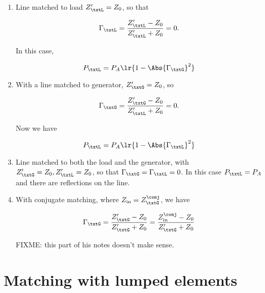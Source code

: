 \begin{enumerate}
\item Line matched to load \( Z_\txtL' = Z_0 \), so that

\begin{dmath}\label{eqn:uwavesDeck6LCmatchingCore:80}
\Gamma_\txtL 
= \frac{Z_\txtL' - Z_0}{Z_\txtL' + Z_0}
= 0.
\end{dmath}

In this case, 

\begin{dmath}\label{eqn:uwavesDeck6LCmatchingCore:100}
P_\txtL = P_A \lr{ 1 - \Abs{\Gamma_\txtG}^2 }
\end{dmath}

\item With a line matched to generator, \( Z_\txtG' = Z_0 \), so

\begin{dmath}\label{eqn:uwavesDeck6LCmatchingCore:120}
\Gamma_\txtG 
= \frac{Z_\txtG' - Z_0}{Z_\txtL' + Z_0}
= 0.
\end{dmath}

Now we have

\begin{dmath}\label{eqn:uwavesDeck6LCmatchingCore:140}
P_\txtL = P_A \lr{ 1 - \Abs{\Gamma_\txtL}^2 }
\end{dmath}

\item Line matched to both the load and the generator, with \( Z_\txtG' = Z_0, Z_\txtL' = Z_0 \), 
so that \( \Gamma_\txtG = \Gamma_\txtL = 0 \).
In this case \( P_\txtL = P_A \) and there are reflections on the line.

\item With conjugate matching, where \( Z_{\textrm{in}} = Z_\txtG^\conj \), we have

\begin{dmath}\label{eqn:uwavesDeck6LCmatchingCore:160}
\Gamma_\txtG 
= \frac{Z_\txtG' - Z_0}{Z_\txtG' + Z_0}
= \frac{Z_{\textrm{in}}^\conj - Z_0}{Z_\txtG' + Z_0}
\end{dmath}

FIXME: this part of his notes doesn't make sense.

\end{enumerate}

\section{Matching with lumped elements}

